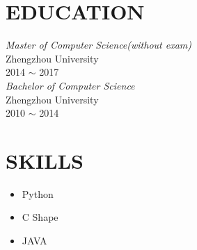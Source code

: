 \documentclass[line, margin]{res}
\begin{document}


\begin{resume}
\section{EDUCATION} 
 {\sl Master of Computer Science(without exam)} \\
 Zhengzhou University \\
 2014 $\sim$ 2017 \\
[15pt]
 {\sl Bachelor of Computer Science} \\
 Zhengzhou University \\
 2010 $\sim$ 2014
 
\section{SKILLS}
\begin{itemize}
\item Python
\item C Shape
\item JAVA
\end{itemize}

\end{resume}
\end{document}
